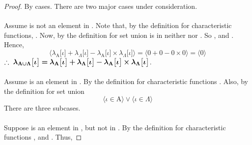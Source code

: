 \documentclass[a4paper, 12pt]{article}
\theoremstyle{plain}
\begin{document}
\begin{proof}
    By cases. There are two major cases under consideration.
    \\ \\
     Assume \bm{$\iota$} is not an element in . 
    Note that, by the definition for characteristic functions, 
    .
    Now, by the definition for set union 
    \bm{$\iota$} is in neither  nor \bm{$\Lambda$}.
    So , 
    and . 
    Hence,
    \begin{equation*}
        \bigg \langle
            \lambda_{\mathrm{A}} \big[ \iota \big] 
                + 
            \lambda_{\Lambda} \big[ \iota \big] 
                - 
            \lambda_{\mathrm{A}} \big[ \iota \big] 
                \times 
            \lambda_{\Lambda} \big[ \iota \big] 
        \bigg \rangle
            =
        \bigg \langle 
            0 + 0 - 0 \times 0 
        \bigg \rangle
            =
        \bigg \langle 
            0
        \bigg \rangle
    \end{equation*}
    $\therefore \text{\space} \bm{
        \lambda_{\mathrm{A} \cup \Lambda} \big[ \iota \big] 
            = 
        \lambda_{\mathrm{A}} \big[ \iota \big] 
            + 
        \lambda_{\Lambda} \big[ \iota \big] 
            - 
        \lambda_{\mathrm{A}} \big[ \iota \big]
            \times 
        \lambda_{\Lambda} \big[ \iota \big]
    }$.
    \\ \\
     Assume \bm{$\iota$} is an element in . 
    By the definition for characteristic functions 
    . 
    Also, by the definition for set union 
    \begin{equation*}        
        \Big \langle \iota \in \mathrm{A} \Big \rangle 
            \lor 
        \Big \langle \iota \in \Lambda \Big \rangle
    \end{equation*}
    There are three subcases. 
    \\ \\
     Suppose \bm{$\iota$} is an element in , but not in \bm{$\Lambda$}.
    By the definition for characteristic functions 
    , 
    and . 
    Thus,

\end{proof}
\end{document}
